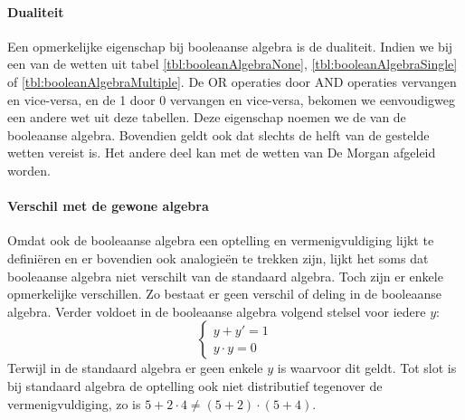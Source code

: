 \paragraph{Dualiteit}Een opmerkelijke eigenschap bij booleaanse algebra is de dualiteit. Indien we bij een van de wetten uit tabel \ref{tbl:booleanAlgebraNone}, \ref{tbl:booleanAlgebraSingle} of \ref{tbl:booleanAlgebraMultiple}. De OR operaties door AND operaties vervangen en vice-versa, en de 1 door 0 vervangen en vice-versa, bekomen we eenvoudigweg een andere wet uit deze tabellen. Deze eigenschap noemen we de  van de booleaanse algebra. Bovendien geldt ook dat slechts de helft van de gestelde wetten vereist is. Het andere deel kan met de wetten van De Morgan afgeleid worden.
\paragraph{Verschil met de gewone algebra}Omdat ook de booleaanse algebra een optelling en vermenigvuldiging lijkt te defini\"eren en er bovendien ook analogie\"en te trekken zijn, lijkt het soms dat booleaanse algebra niet verschilt van de standaard algebra. Toch zijn er enkele opmerkelijke verschillen. Zo bestaat er geen verschil of deling in de booleaanse algebra. Verder voldoet in de booleaanse algebra volgend stelsel voor iedere $y$:
\begin{equation}
\left\{\begin{array}{l}
y+y'=1\\
y\cdot y=0
\end{array}\right.
\end{equation}
Terwijl in de standaard algebra er geen enkele $y$ is waarvoor dit geldt. Tot slot is bij standaard algebra de optelling ook niet distributief tegenover de vermenigvuldiging, zo is $5+2\cdot4\neq(5+2)\cdot(5+4)$.
